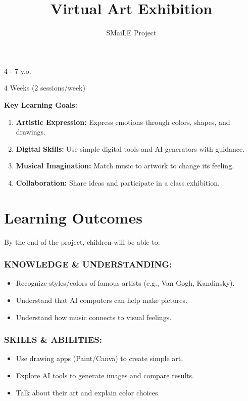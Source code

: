 \documentclass[11pt, a4paper]{article}
\begin{document}
\title{\textbf{\color{SmailePink}Virtual Art Exhibition}}
\author{SMaiLE Project}
\date{}
\maketitle
\thispagestyle{plain}

\begin{keyinfobox}
    \begin{description}[leftmargin=*, labelindent=0pt]
        \item[\bfseries\color{SmailePink} Target Group:] 4 - 7 y.o.
        \item[\bfseries\color{SmailePink} Duration:] 4 Weeks (2 sessions/week)
    \end{description}
    \textbf{Key Learning Goals:}
    \begin{enumerate}
        \item \textbf{Artistic Expression:} Express emotions through colors, shapes, and drawings.
        \item \textbf{Digital Skills:} Use simple digital tools and AI generators with guidance.
        \item \textbf{Musical Imagination:} Match music to artwork to change its feeling.
        \item \textbf{Collaboration:} Share ideas and participate in a class exhibition.
    \end{enumerate}
\end{keyinfobox}

\section*{Learning Outcomes}
By the end of the project, children will be able to:

\subsubsection*{KNOWLEDGE \& UNDERSTANDING:}
\begin{itemize}
    \item Recognize styles/colors of famous artists (e.g., Van Gogh, Kandinsky).
    \item Understand that AI computers can help make pictures.
    \item Understand how music connects to visual feelings.
\end{itemize}

\subsubsection*{SKILLS \& ABILITIES:}
\begin{itemize}
    \item Use drawing apps (Paint/Canva) to create simple art.
    \item Explore AI tools to generate images and compare results.
    \item Talk about their art and explain color choices.
\end{itemize}
\end{document}
